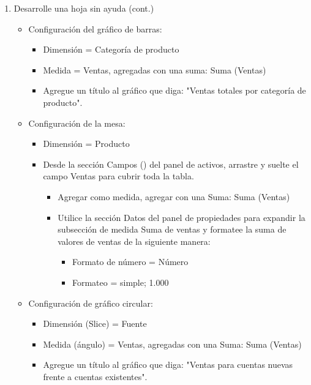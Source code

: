 \documentclass[12pt,letterpaper]{article}
\begin{document}
\begin{enumerate}
\begin{itemize}
\begin{center}
        \end{center}
    \end{itemize}
    \item Desarrolle una hoja sin ayuda (cont.)
    \begin{itemize}
        \item Configuración del gráfico de barras:
        \begin{itemize}
            \item Dimensión = Categoría de producto
            \item Medida = Ventas, agregadas con una suma: Suma (Ventas)
            \item Agregue un título al gráfico que diga: "Ventas totales por categoría de producto".
        \end{itemize}
        \item Configuración de la mesa:
        \begin{itemize}
            \item Dimensión = Producto
            \item Desde la sección Campos () del panel de activos, arrastre y suelte el campo Ventas para cubrir toda la tabla.
            \begin{itemize}
                \item Agregar como medida, agregar con una Suma: Suma (Ventas)
                \item Utilice la sección Datos del panel de propiedades para expandir la subsección de medida Suma de ventas y formatee la suma de valores de ventas de la siguiente manera:
                \begin{itemize}
                    \item Formato de número = Número
                    \item Formateo = simple; 1.000
                \end{itemize}
            \end{itemize}
        \end{itemize}
        \item Configuración de gráfico circular:
        \begin{itemize}
            \item Dimensión (Slice) = Fuente
            \item Medida (ángulo) = Ventas, agregadas con una Suma: Suma (Ventas)
            \item Agregue un título al gráfico que diga: "Ventas para cuentas nuevas frente a cuentas existentes".

\end{itemize}
\end{itemize}
\end{enumerate}
\end{document}
